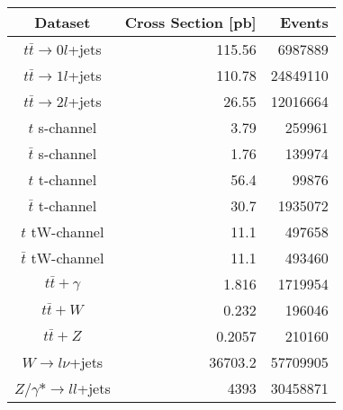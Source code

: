 \begin{table}[h]
\begin{centering}
\begin{tabular}{c|r|r} \hline \hline
Dataset & Cross Section [pb] & Events \\
\hline
$t\bar{t} \rightarrow 0l$+jets  & 115.56 & 6987889 \\
$t\bar{t} \rightarrow 1l$+jets  & 110.78 & 24849110 \\
$t\bar{t} \rightarrow 2l$+jets  & 26.55 & 12016664 \\
\hline
$t$ s-channel & 3.79 & 259961 \\
$\bar{t}$ s-channel & 1.76 & 139974 \\
$t$ t-channel & 56.4 & 99876 \\
$\bar{t}$ t-channel & 30.7 & 1935072 \\
$t$ tW-channel & 11.1 & 497658 \\
$\bar{t}$ tW-channel & 11.1 & 493460 \\
\hline
$t\bar{t}+\gamma$ & 1.816 & 1719954\\
$t\bar{t}+W$ & 0.232 & 196046\\
$t\bar{t}+Z$ & 0.2057 & 210160\\
\hline
$W \rightarrow l\nu$+jets & 36703.2 & 57709905 \\
$Z/\gamma* \rightarrow ll$+jets & 4393 & 30458871\\
\hline \hline
\end{tabular}
\end{centering}
\end{table}
